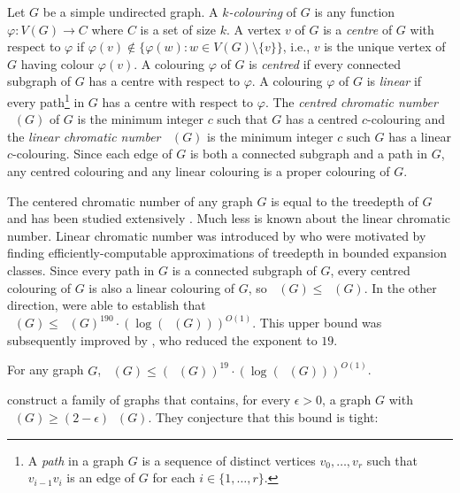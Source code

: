 \documentclass{patmorin}
\newcommand{\defin}[1]{\emph{\color{brightmaroon}#1}}
\DeclareMathOperator{\chicen}{\chi_{\mathrm{cen}}}
\DeclareMathOperator{\chilin}{\chi_{\mathrm{lin}}}
\begin{document}
Let $G$ be a simple undirected graph.  A \defin{$k$-colouring} of $G$ is any function $\varphi:V(G)\to C$ where $C$ is a set of size $k$.  A vertex $v$ of $G$ is a \defin{centre} of $G$ with respect to $\varphi$ if $\varphi(v)\not\in\{\varphi(w):w\in V(G)\setminus\{v\}\}$, i.e., $v$ is the unique vertex of $G$ having colour $\varphi(v)$.  A colouring $\varphi$ of $G$ is \defin{centred} if every connected subgraph of $G$ has a centre with respect to $\varphi$. A colouring $\varphi$ of $G$ is \defin{linear} if every path\footnote{A \defin{path} in a graph $G$ is a sequence of distinct vertices $v_0,\ldots,v_r$ such that $v_{i-1}v_i$ is an edge of $G$ for each $i\in\{1,\ldots,r\}$.} in $G$ has a centre with respect to $\varphi$.  The \defin{centred chromatic number} $\chicen(G)$ of $G$ is the minimum integer $c$ such that $G$ has a centred $c$-colouring and the \defin{linear chromatic number} $\chilin(G)$ is the minimum integer $c$ such $G$ has a linear $c$-colouring.  Since each edge of $G$ is both a connected subgraph and a path in $G$, any centred colouring and any linear colouring is a proper colouring of $G$.

The centered chromatic number of any graph $G$ is equal to the treedepth of $G$ and has been studied extensively \cite{nesetril.ossona:sparsity,nesetril.ossona:on,nesetril.ossona:grad,nesetril.ossona:tree-depth,pilipczuk.siebertz:polynomial,dereniowski.nadolski:vertex,dereniowski.kubale:cholesky,deogun.kloks.ea:on,bodlaender.gilbert.ea:approximating,bodlaender.deogun.ea:rankings}. Much less is known about the linear chromatic number.  Linear chromatic number was introduced by \citet{kun.obrien.ea:polynomial} who were motivated by finding efficiently-computable approximations of treedepth in bounded expansion classes.  Since every path in $G$ is a connected subgraph of $G$, every centred colouring of $G$ is also a linear colouring of $G$, so $\chilin(G)\le\chicen(G)$. In the other direction, \citet{kun.obrien.ea:polynomial} were able to establish that $\chicen(G)\le \chilin(G)^{190}\cdot(\log(\chilin(G)))^{O(1)}$.  This upper bound was subsequently improved by \citet{czerwinski.nadara.ea:improved}, who reduced the exponent to $19$.

\begin{thm}\label{kun_obrien_general}
  For any graph $G$, $\chicen(G)\le (\chilin(G))^{19}\cdot(\log(\chilin(G)))^{O(1)}$.
\end{thm}

\citet{kun.obrien.ea:polynomial} construct a family of graphs that contains, for every $\epsilon > 0$, a graph $G$ with $\chicen(G)\ge (2-\epsilon)\chilin(G)$. They conjecture that this bound is tight:
\end{document}
